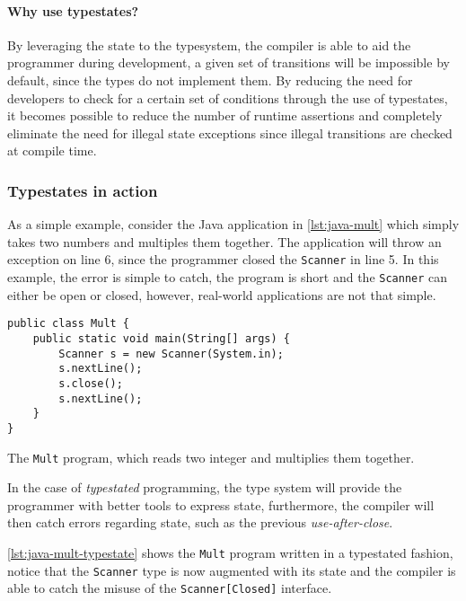 \paragraph{Why use typestates?}
By leveraging the state to the typesystem, the compiler is able to aid the programmer during development,
a given set of transitions will be impossible by default, since the types do not implement them. %
By reducing the need for developers to check for a certain set of conditions through the use of typestates,
it becomes possible to reduce the number of runtime assertions and
completely eliminate the need for illegal state exceptions since illegal transitions are checked at compile time.


\subsubsection*{Typestates in action}

As a simple example, consider the Java application in \autoref{lst:java-mult} which simply takes two numbers and multiples them together.
The application will throw an exception on line 6,
since the programmer closed the \texttt{Scanner} in line 5.
In this example, the error is simple to catch,
the program is short and the \texttt{Scanner} can either be open or closed,
however, real-world applications are not that simple.

\begin{listing}
    \centering
    \begin{verbatim}
public class Mult {
    public static void main(String[] args) {
        Scanner s = new Scanner(System.in);
        s.nextLine();
        s.close();
        s.nextLine();
    }
}
    \end{verbatim}
    \caption{The \texttt{Mult} program, which reads two integer and multiplies them together.}
    \label{lst:java-mult}
\end{listing}

In the case of \emph{typestated} programming,
the type system will provide the programmer with better tools to express state,
furthermore, the compiler will then catch errors regarding state,
such as the previous \emph{use-after-close}.

\autoref{lst:java-mult-typestate} shows the \texttt{Mult} program written in a typestated fashion,
notice that the \texttt{Scanner} type is now augmented with its state and
the compiler is able to catch the misuse of the \texttt{Scanner[Closed]} interface.


